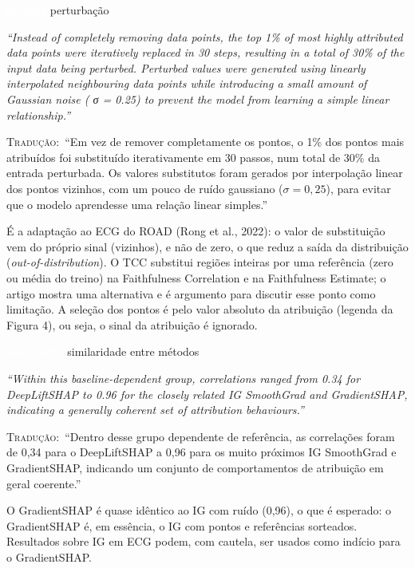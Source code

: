\documentclass[11pt,a4paper]{article}
\newcommand{\pagechip}[1]{{\setlength{\fboxsep}{1.5pt}\colorbox{cAcc}{\textcolor{white}{\scriptsize\texttt{#1}}}}}
\newenvironment{origquote}{\par\itshape\small}{\par}
\newenvironment{tradquote}{\par\small\textsc{Tradução:}\ }{\par}
\newcommand{\explab}[1]{\par\smallskip{\small\color{cAcc}\textbf{\MakeUppercase{#1}}}\par}
\begin{document}
\begin{citacard}{\pagechip{Métodos} perturbação}
\begin{origquote}“Instead of completely removing data points, the top 1\% of most highly attributed data points were iteratively replaced in 30 steps, resulting in a total of 30\% of the input data being perturbed. Perturbed values were generated using linearly interpolated neighbouring data points while introducing a small amount of Gaussian noise ( σ = 0.25) to prevent the model from learning a simple linear relationship.”\end{origquote}
\begin{tradquote}“Em vez de remover completamente os pontos, o 1\% dos pontos mais atribuídos foi substituído iterativamente em 30 passos, num total de 30\% da entrada perturbada. Os valores substitutos foram gerados por interpolação linear dos pontos vizinhos, com um pouco de ruído gaussiano ($\sigma = 0{,}25$), para evitar que o modelo aprendesse uma relação linear simples.”\end{tradquote}
\explab{Explicação}
É a adaptação ao ECG do ROAD (Rong et al., 2022): o valor de substituição vem do próprio sinal (vizinhos), e não de zero, o que reduz a saída da distribuição (\textit{out-of-distribution}). O TCC substitui regiões inteiras por uma referência (zero ou média do treino) na Faithfulness Correlation e na Faithfulness Estimate; o artigo mostra uma alternativa e é argumento para discutir esse ponto como limitação. A seleção dos pontos é pelo valor absoluto da atribuição (legenda da Figura 4), ou seja, o sinal da atribuição é ignorado.
\end{citacard}

\begin{citacard}{\pagechip{Resultados} similaridade entre métodos}
\begin{origquote}“Within this baseline-dependent group, correlations ranged from 0.34 for DeepLiftSHAP to 0.96 for the closely related IG SmoothGrad and GradientSHAP, indicating a generally coherent set of attribution behaviours.”\end{origquote}
\begin{tradquote}“Dentro desse grupo dependente de referência, as correlações foram de 0,34 para o DeepLiftSHAP a 0,96 para os muito próximos IG SmoothGrad e GradientSHAP, indicando um conjunto de comportamentos de atribuição em geral coerente.”\end{tradquote}
\explab{Explicação}
O GradientSHAP é quase idêntico ao IG com ruído (0,96), o que é esperado: o GradientSHAP é, em essência, o IG com pontos e referências sorteados. Resultados sobre IG em ECG podem, com cautela, ser usados como indício para o GradientSHAP.
\end{citacard}
\end{document}

